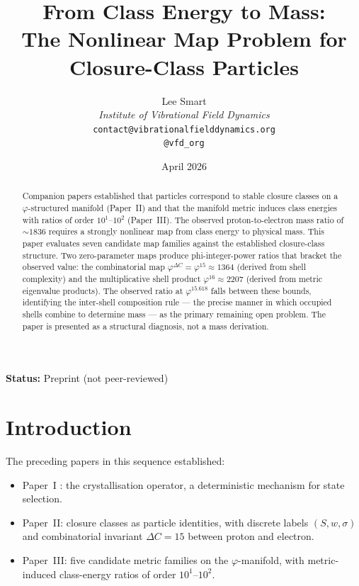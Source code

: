 \documentclass[12pt]{article}
\title{From Class Energy to Mass:\\The Nonlinear Map Problem for Closure-Class Particles}
\author{%
  Lee Smart\\[4pt]
  \textit{Institute of Vibrational Field Dynamics}\\[2pt]
  \texttt{contact@vibrationalfielddynamics.org}\\[2pt]
  \texttt{@vfd\_org}%
}
\date{April 2026}
\newcommand{\phig}{\varphi}
\begin{document}
\maketitle

\noindent\textbf{Status:} Preprint (not peer-reviewed)

\begin{abstract}
Companion papers established that particles correspond to stable closure classes on a $\phig$-structured manifold (Paper~II) and that the manifold metric induces class energies with ratios of order $10^1$--$10^2$ (Paper~III). The observed proton-to-electron mass ratio of $\sim\!1836$ requires a strongly nonlinear map from class energy to physical mass. This paper evaluates seven candidate map families against the established closure-class structure. Two zero-parameter maps produce phi-integer-power ratios that bracket the observed value: the combinatorial map $\phig^{\Delta C} = \phig^{15} \approx 1364$ (derived from shell complexity) and the multiplicative shell product $\phig^{16} \approx 2207$ (derived from metric eigenvalue products). The observed ratio at $\phig^{15.618}$ falls between these bounds, identifying the inter-shell composition rule --- the precise manner in which occupied shells combine to determine mass --- as the primary remaining open problem. The paper is presented as a structural diagnosis, not a mass derivation.
\end{abstract}

\section{Introduction}

The preceding papers in this sequence established:
\begin{itemize}
    \item Paper~I \citep{Smart2026}: the crystallisation operator, a deterministic mechanism for state selection.
    \item Paper~II: closure classes as particle identities, with discrete labels $(S, w, \sigma)$ and combinatorial invariant $\Delta C = 15$ between proton and electron.
    \item Paper~III: five candidate metric families on the $\phig$-manifold, with metric-induced class-energy ratios of order $10^1$--$10^2$.
\end{itemize}
\end{document}
